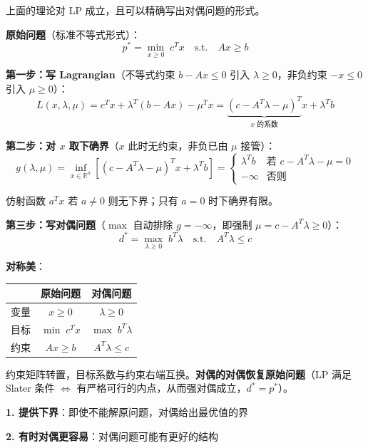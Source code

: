 \documentclass[12pt, a4paper]{ctexart}
\begin{document}
\begin{blackboard}

上面的理论对 LP 成立，且可以精确写出对偶问题的形式。

\textbf{原始问题}（标准不等式形式）：
\[
p^* = \min_{x \geq 0} \; c^T x \quad \text{s.t.} \quad Ax \geq b
\]

\textbf{第一步：写 Lagrangian}（不等式约束 $b - Ax \leq 0$ 引入 $\lambda \geq 0$，非负约束 $-x \leq 0$ 引入 $\mu \geq 0$）：
\[
L(x, \lambda, \mu)
= c^T x + \lambda^T(b - Ax) - \mu^T x
= \underbrace{(c - A^T\lambda - \mu)^T}_{\text{$x$ 的系数}} x + \lambda^T b
\]

\textbf{第二步：对 $x$ 取下确界}（$x$ 此时无约束，非负已由 $\mu$ 接管）：
\[
g(\lambda, \mu) = \inf_{x \in \mathbb{R}^n} \left[(c - A^T\lambda - \mu)^T x + \lambda^T b\right]
= \begin{cases} \lambda^T b & \text{若 } c - A^T\lambda - \mu = 0 \\ -\infty & \text{否则} \end{cases}
\]

仿射函数 $a^T x$ 若 $a \neq 0$ 则无下界；只有 $a = 0$ 时下确界有限。

\textbf{第三步：写对偶问题}（$\max$ 自动排除 $g = -\infty$，即强制 $\mu = c - A^T\lambda \geq 0$）：
\[
\boxed{d^* = \max_{\lambda \geq 0} \; b^T\lambda \quad \text{s.t.} \quad A^T\lambda \leq c}
\]

\textbf{对称美}：

\begin{center}
\begin{tabular}{c|cc}
 & 原始问题 & 对偶问题 \\
\hline
变量 & $x \geq 0$ & $\lambda \geq 0$ \\
目标 & $\min\; c^T x$ & $\max\; b^T\lambda$ \\
约束 & $Ax \geq b$ & $A^T\lambda \leq c$ \\
\end{tabular}
\end{center}

约束矩阵转置，目标系数与约束右端互换。\textbf{对偶的对偶恢复原始问题}（LP 满足 Slater 条件 $\Leftrightarrow$ 有严格可行的内点，从而强对偶成立，$d^* = p^*$）。

\end{blackboard}

\textbf{1. 提供下界}：即使不能解原问题，对偶给出最优值的界

\textbf{2. 有时对偶更容易}：对偶问题可能有更好的结构
\end{document}
